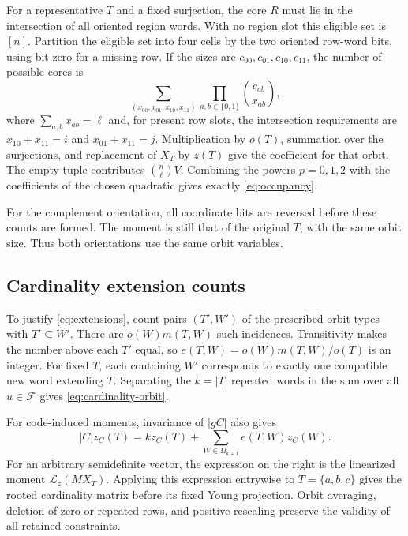 \documentclass[11pt]{article}
\newcommand{\F}{\mathcal F}
\newcommand{\Lz}{\mathcal L_z}
\begin{document}
For a representative $T$ and a fixed surjection, the core $R$ must lie in
the intersection of all oriented region words. With no region slot this
eligible set is $[n]$. Partition the eligible set into four cells by the
two oriented row-word bits, using bit zero for a missing row. If the sizes
are $c_{00},c_{01},c_{10},c_{11}$, the number of possible cores is
\begin{equation}\label{eq:core-coefficient}
 \sum_{(x_{00},x_{01},x_{10},x_{11})}
 \prod_{a,b\in\{0,1\}}\binom{c_{ab}}{x_{ab}},
\end{equation}
where $\sum_{a,b}x_{ab}=\ell$ and, for present row slots, the intersection
requirements are $x_{10}+x_{11}=i$ and $x_{01}+x_{11}=j$.
Multiplication by $o(T)$, summation over the surjections, and replacement
of $X_T$ by $z(T)$ give the coefficient for that orbit. The empty tuple
contributes $\binom n\ell V$. Combining the powers $p=0,1,2$ with the
coefficients of the chosen quadratic gives exactly
\eqref{eq:occupancy}.

For the complement orientation, all coordinate bits are reversed before
these counts are formed. The moment is still that of the original $T$,
with the same orbit size. Thus both orientations use the same orbit
variables.

\subsection{Cardinality extension counts}\label{app:extensions}

To justify \eqref{eq:extensions}, count pairs $(T',W')$ of the prescribed
orbit types with $T'\subseteq W'$. There are $o(W)m(T,W)$ such incidences.
Transitivity makes the number above each $T'$ equal, so
$e(T,W)=o(W)m(T,W)/o(T)$ is an integer. For fixed $T$, each containing
$W'$ corresponds to exactly one compatible new word extending $T$.
Separating the $k=|T|$ repeated words in the sum over all $u\in\F$ gives
\eqref{eq:cardinality-orbit}.

For code-induced moments, invariance of $|gC|$ also gives
\[
 |C|z_C(T)=kz_C(T)+\sum_{W\in\Omega_{k+1}}e(T,W)z_C(W).
\]
For an arbitrary semidefinite vector, the expression on the right is the
linearized moment $\Lz(MX_T)$. Applying this expression entrywise to
$T=\{a,b,c\}$ gives the rooted cardinality matrix before its fixed Young
projection. Orbit averaging, deletion of zero or repeated rows, and
positive rescaling preserve the validity of all retained constraints.
\end{document}
